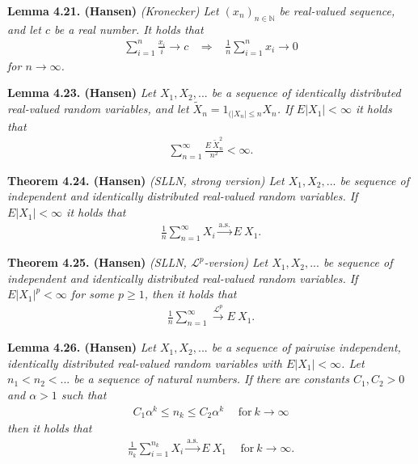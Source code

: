 \documentclass[
]{book}
\begin{document}
\textbf{Lemma 4.21. (Hansen)} \emph{(Kronecker) Let \((x_n)_{n\in\mathbb{N}}\) be real-valued sequence, and let \(c\) be a real number. It holds that}
\begin{align*}
    \sum_{i=1}^n\frac{x_i}{i}\to c \hspace{10pt}\Rightarrow\hspace{10pt} \frac{1}{n}\sum_{i=1}^nx_i\to 0
\end{align*}
\emph{for \(n\to \infty\).}

\textbf{Lemma 4.23. (Hansen)} \emph{Let \(X_1,X_2,...\) be a sequence of identically distributed real-valued random variables, and let \(\tilde{X}_n=1_{(\vert X_n\vert \le n}X_n\). If \(E\vert X_1\vert<\infty\) it holds that}
\begin{align*}
    \sum_{n=1}^\infty\frac{E\ \tilde{X}_n^2}{n^2}<\infty.
\end{align*}

\textbf{Theorem 4.24. (Hansen)} \emph{(SLLN, strong version) Let \(X_1,X_2,...\) be sequence of independent and identically distributed real-valued random variables. If \(E\vert X_1\vert <\infty\) it holds that}
\begin{align*}
    \frac{1}{n}\sum_{n=1}^\infty X_i\stackrel{\text{a.s.}}{\to} E\ X_1.\tag{4.24}
\end{align*}

\textbf{Theorem 4.25. (Hansen)} \emph{(SLLN, \(\mathcal{L}^p\)-version) Let \(X_1,X_2,...\) be sequence of independent and identically distributed real-valued random variables. If \(E\vert X_1\vert^p <\infty\) for some \(p\ge 1\), then it holds that}
\begin{align*}
\frac{1}{n}\sum_{n=1}^\infty \stackrel{\mathcal{L}^p}{\to} E\ X_1.\tag{4.26}    
\end{align*}

\textbf{Lemma 4.26. (Hansen)} \emph{Let \(X_1,X_2,...\) be a sequence of pairwise independent, identically distributed real-valued random variables with \(E\vert X_1\vert <\infty\). Let \(n_1<n_2<...\) be a sequence of natural numbers. If there are constants \(C_1,C_2>0\) and \(\alpha>1\) such that}
\begin{align*}
    C_1\alpha^k\le n_k\le C_2\alpha^k\hspace{15pt}\text{for}\ k\to\infty\tag{4.27}
\end{align*}
\emph{then it holds that}
\begin{align*}
    \frac{1}{n_k}\sum_{i=1}^{n_k}X_i\stackrel{\text{a.s.}}{\to} E\ X_1\hspace{15pt}\text{for}\ k\to \infty.
\end{align*}
\end{document}

